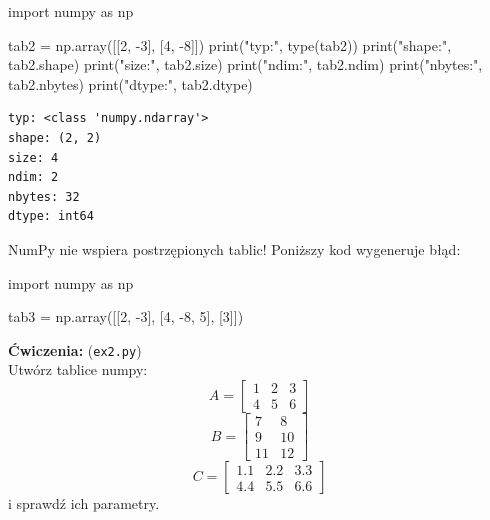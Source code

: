 \documentclass[
  letterpaper,
  DIV=11,
  numbers=noendperiod]{scrreprt}
\newenvironment{Shaded}{\begin{snugshade}}{\end{snugshade}}
\newcommand{\BuiltInTok}[1]{\textcolor[rgb]{0.00,0.23,0.31}{#1}}
\newcommand{\DecValTok}[1]{\textcolor[rgb]{0.68,0.00,0.00}{#1}}
\newcommand{\ImportTok}[1]{\textcolor[rgb]{0.00,0.46,0.62}{#1}}
\newcommand{\NormalTok}[1]{\textcolor[rgb]{0.00,0.23,0.31}{#1}}
\newcommand{\OperatorTok}[1]{\textcolor[rgb]{0.37,0.37,0.37}{#1}}
\newcommand{\StringTok}[1]{\textcolor[rgb]{0.13,0.47,0.30}{#1}}
\begin{document}
\begin{Shaded}
\begin{Highlighting}[]
\ImportTok{import}\NormalTok{ numpy }\ImportTok{as}\NormalTok{ np}

\NormalTok{tab2 }\OperatorTok{=}\NormalTok{ np.array([[}\DecValTok{2}\NormalTok{, }\OperatorTok{{-}}\DecValTok{3}\NormalTok{], [}\DecValTok{4}\NormalTok{, }\OperatorTok{{-}}\DecValTok{8}\NormalTok{]])}
\BuiltInTok{print}\NormalTok{(}\StringTok{"typ:"}\NormalTok{, }\BuiltInTok{type}\NormalTok{(tab2))}
\BuiltInTok{print}\NormalTok{(}\StringTok{"shape:"}\NormalTok{, tab2.shape)}
\BuiltInTok{print}\NormalTok{(}\StringTok{"size:"}\NormalTok{, tab2.size)}
\BuiltInTok{print}\NormalTok{(}\StringTok{"ndim:"}\NormalTok{, tab2.ndim)}
\BuiltInTok{print}\NormalTok{(}\StringTok{"nbytes:"}\NormalTok{, tab2.nbytes)}
\BuiltInTok{print}\NormalTok{(}\StringTok{"dtype:"}\NormalTok{, tab2.dtype)}
\end{Highlighting}
\end{Shaded}

\begin{verbatim}
typ: <class 'numpy.ndarray'>
shape: (2, 2)
size: 4
ndim: 2
nbytes: 32
dtype: int64
\end{verbatim}

NumPy nie wspiera postrzępionych tablic! Poniższy kod wygeneruje błąd:

\begin{Shaded}
\begin{Highlighting}[]
\ImportTok{import}\NormalTok{ numpy }\ImportTok{as}\NormalTok{ np}

\NormalTok{tab3 }\OperatorTok{=}\NormalTok{ np.array([[}\DecValTok{2}\NormalTok{, }\OperatorTok{{-}}\DecValTok{3}\NormalTok{], [}\DecValTok{4}\NormalTok{, }\OperatorTok{{-}}\DecValTok{8}\NormalTok{, }\DecValTok{5}\NormalTok{], [}\DecValTok{3}\NormalTok{]])}
\end{Highlighting}
\end{Shaded}

\textbf{Ćwiczenia:} (\texttt{ex2.py})\\
Utwórz tablice numpy: \[
A = \begin{bmatrix} 1 & 2 & 3 \\ 4 & 5 & 6 \end{bmatrix}
\] \[B = \begin{bmatrix} 7 & 8 \\ 9 & 10 \\ 11 & 12 \end{bmatrix}\]
\[C = \begin{bmatrix} 1.1 & 2.2 & 3.3 \\ 4.4 & 5.5 & 6.6 \end{bmatrix}\]
i sprawdź ich parametry.
\end{document}
